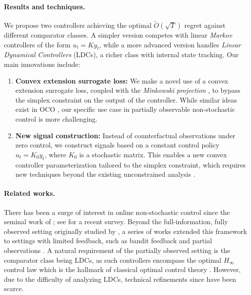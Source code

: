 \paragraph{Results and techniques.} 
We propose two controllers achieving the optimal $\tilde{O}(\sqrt{T})$ regret against different comparator classes. A simpler version competes with linear \emph{Markov} controllers of the form $u_t = K y_t$, while a more advanced version handles \emph{Linear Dynamical Controllers} (LDCs), a richer class with internal state tracking. Our main innovations include:
\begin{enumerate}
    \item \textbf{Convex extension surrogate loss:} We make a novel use of a convex extension surrogate loss, coupled with the \emph{Minkowski projection} \citep{mhammedi2022efficient}, to bypass the simplex constraint on the output of the controller. While similar ideas exist in OCO \citep{cutkosky2018black}, our specific use case in partially observable non-stochastic control is more challenging.
    \item \textbf{New signal construction:} Instead of counterfactual observations under zero control, we construct signals based on a constant control policy $u_t = K_0 y_t$, where $K_0$ is a stochastic matrix. This enables a new convex controller parameterization tailored to the simplex constraint, which requires new techniques beyond the existing unconstrained analysis \citep{simchowitz2020improper}.
\end{enumerate}

\paragraph{Related works.} There has been a surge of interest in online non-stochastic control since the seminal work of \citet{agarwal2019online}; see \citep{hazan2022introduction} for a recent survey. Beyond the full-information, fully observed setting originally studied by \cite{agarwal2019online}, a series of works extended this framework to settings with limited feedback, such as bandit feedback \citep{cassel2020bandit,sun2024optimal,suggala2024second,sun2024tight} and partial observations \citep{simchowitz2020improper,yan2023online}. A natural requirement of the partially observed setting is the comparator class being LDCs, as such controllers encompass the optimal $H_{\infty}$ control law which is the hallmark of classical optimal control theory \citep{bacsar2008h}. However, due to the difficulty of analyzing LDCs, technical refinements since \citep{simchowitz2020improper} have been scarce. 

